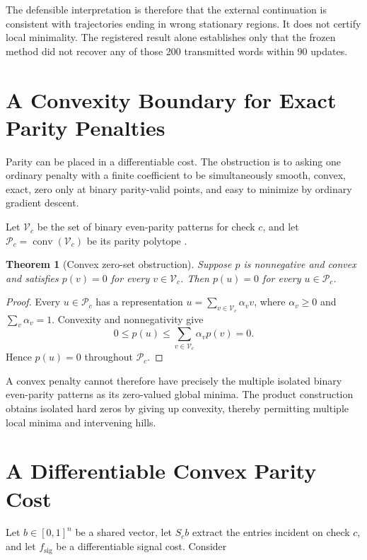 \documentclass[11pt]{article}
\newtheorem{theorem}{Theorem}
\theoremstyle{remark}
\newcommand{\Pc}{\mathcal{P}_c}
\newcommand{\Vc}{\mathcal{V}_c}
\begin{document}
The defensible interpretation is therefore that the external continuation is
consistent with trajectories ending in wrong stationary regions.  It does not
certify local minimality.  The registered result alone establishes only that
the frozen method did not recover any of those 200 transmitted words within
90 updates.

\section{A Convexity Boundary for Exact Parity Penalties}

Parity can be placed in a differentiable cost.  The obstruction is to asking
one ordinary penalty with a finite coefficient to be simultaneously smooth,
convex, exact,
zero only at binary parity-valid points, and easy to minimize by ordinary
gradient descent.

Let $\Vc$ be the set of binary even-parity patterns for check $c$, and let
$\Pc=\operatorname{conv}(\Vc)$ be its parity polytope
\cite{barman2013decomposition}.

\begin{theorem}[Convex zero-set obstruction]
Suppose $p$ is nonnegative and convex and satisfies $p(v)=0$ for every
$v\in\Vc$.  Then $p(u)=0$ for every $u\in\Pc$.
\end{theorem}

\begin{proof}
Every $u\in\Pc$ has a representation
$u=\sum_{v\in\Vc}\alpha_vv$, where $\alpha_v\ge0$ and
$\sum_v\alpha_v=1$.  Convexity and nonnegativity give
\begin{equation}
0\le p(u)
\le\sum_{v\in\Vc}\alpha_vp(v)=0.
\end{equation}
Hence $p(u)=0$ throughout $\Pc$.
\end{proof}

A convex penalty cannot therefore have precisely the multiple isolated binary
even-parity patterns as its zero-valued global minima.  The product
construction obtains isolated hard zeros by giving up convexity, thereby
permitting multiple local minima and intervening hills.

\section{A Differentiable Convex Parity Cost}

Let $b\in[0,1]^n$ be a shared vector, let $S_cb$ extract the entries incident
on check $c$, and let $f_{\mathrm{sig}}$ be a differentiable signal cost.
Consider
\end{document}
